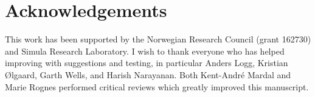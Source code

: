 \section{Acknowledgements}

This work has been supported by the Norwegian Research Council (grant
162730) and Simula Research Laboratory.  I wish to thank everyone who
has helped improving \ufl{} with suggestions and testing, in
particular Anders Logg, Kristian \O{}lgaard, Garth Wells, and Harish
Narayanan.  Both Kent-Andr\'e Mardal and Marie Rognes performed
critical reviews which greatly improved this manuscript.
